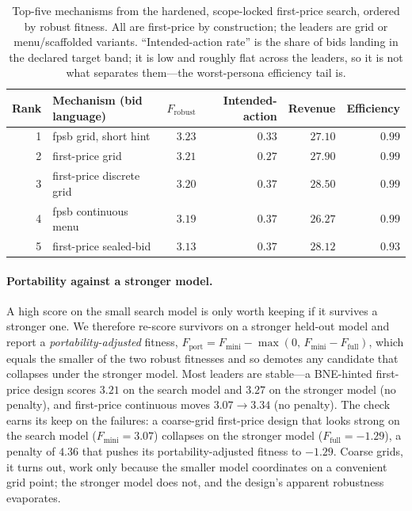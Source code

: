 \documentclass[12pt]{article}
\begin{document}
\begin{table}[t]
\centering
\caption{Top-five mechanisms from the hardened, scope-locked first-price search,
ordered by robust fitness. All are first-price by construction; the leaders are grid
or menu/scaffolded variants. ``Intended-action rate'' is the share of bids landing in
the declared target band; it is low and roughly flat across the leaders, so it is not
what separates them---the worst-persona efficiency tail is.}
\label{tab:scopelocked}
\footnotesize
\setlength{\tabcolsep}{5pt}
\begin{tabular}{@{}rlrrrr@{}}
\toprule
Rank & Mechanism (bid language) & $F_{\mathrm{robust}}$ & Intended-action & Revenue & Efficiency \\
\midrule
1 & fpsb grid, short hint   & $3.23$ & $0.33$ & $27.10$ & $0.99$ \\
2 & first-price grid        & $3.21$ & $0.27$ & $27.90$ & $0.99$ \\
3 & first-price discrete grid & $3.20$ & $0.37$ & $28.50$ & $0.99$ \\
4 & fpsb continuous menu    & $3.19$ & $0.37$ & $26.27$ & $0.99$ \\
5 & first-price sealed-bid  & $3.13$ & $0.37$ & $28.12$ & $0.93$ \\
\bottomrule
\end{tabular}
\end{table}

\paragraph{Portability against a stronger model.} A high score on the small search
model is only worth keeping if it survives a stronger one. We therefore re-score
survivors on a stronger held-out model and report a \emph{portability-adjusted}
fitness, $F_{\mathrm{port}} = F_{\mathrm{mini}} - \max(0,\,F_{\mathrm{mini}} -
F_{\mathrm{full}})$, which equals the smaller of the two robust fitnesses and so
demotes any candidate that collapses under the stronger model. Most leaders are
stable---a BNE-hinted first-price design scores $3.21$ on the search model and $3.27$
on the stronger model (no penalty), and first-price continuous moves $3.07
\rightarrow 3.34$ (no penalty). The check earns its keep on the failures: a
coarse-grid first-price design that looks strong on the search model
($F_{\mathrm{mini}}=3.07$) collapses on the stronger model ($F_{\mathrm{full}}=-1.29$),
a penalty of $4.36$ that pushes its portability-adjusted fitness to $-1.29$. Coarse
grids, it turns out, work only because the smaller model coordinates on a convenient
grid point; the stronger model does not, and the design's apparent robustness
evaporates.
\end{document}
